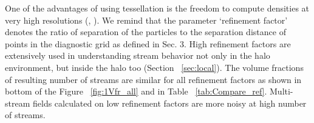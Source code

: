 One of the advantages of using tessellation is the freedom to compute densities at very high resolutions (\cite{Abel2012}, \cite{Shandarin2012}). We remind that the parameter `refinement factor' denotes the ratio of separation of the particles to the separation distance of points in the diagnostic grid as defined in Sec. 3. High refinement factors are extensively used in understanding stream behavior not only in the halo environment, but inside the halo too (Section ~\ref{sec:local}). The volume fractions of resulting number of streams are
similar for all refinement factors as
shown in bottom of the Figure ~\ref{fig:1Vfr_all} and in Table ~\ref{tab:Compare_ref}. %
Multi-stream fields calculated on low refinement factors are more noisy at high number of streams.


